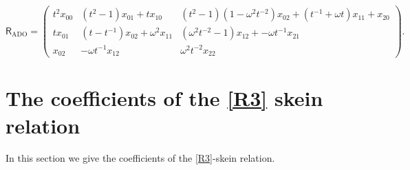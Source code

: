 \documentclass[12pt,reqno]{amsart}
\theoremstyle{definition}
\def\ADO{\mathrm{ADO}}
\begin{document}
\begin{equation*}
\mathsf{R}_{\ADO}=
\left(
\begin{array}{ccc}
t^2 x_{00} 
& 
(t^2-1) x_{01}
+ 
t x_{10}
& 
(t^2-1)(1-\omega^2t^{-2}) x_{02}
+
(t^{-1}+\omega t) x_{11}
+
x_{20}
\\
t x_{01}
& 
(t-t^{-1}) x_{02}
+
\omega^2 x_{11}
& 
(\omega^2 t^{-2}-1) x_{12}
+
-\omega t^{-1} x_{21}
\\
x_{02}
&
-\omega t^{-1} x_{12}
&
\omega^2 t^{-2} x_{22}
\end{array}
\right).
\end{equation*}


\section{The coefficients of the \texorpdfstring{\eqref{R3}}{R3} skein relation}
\label{sec.R123}

In this section we give the coefficients of the \eqref{R3}-skein relation. 
\end{document}
